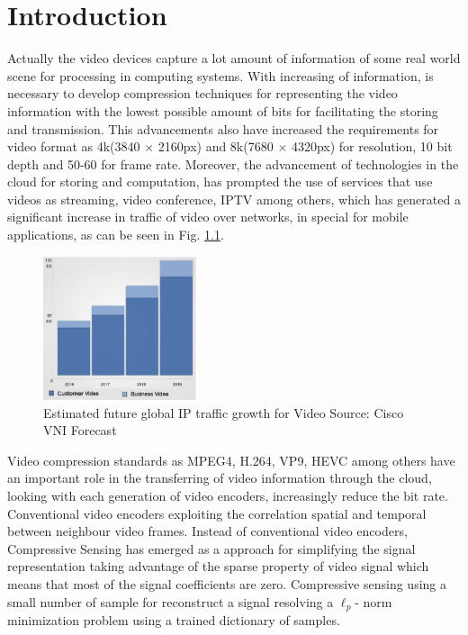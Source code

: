 \chapter{Introduction}


Actually the video devices capture a lot amount of information of some real world scene for processing in computing systems. With increasing of information, is necessary  to develop compression techniques for representing the video information with the lowest possible amount of bits for facilitating the storing and transmission. This advancements also have increased the requirements for video format as 4k(3840 $\times$ 2160px) and 8k(7680 $\times$ 4320px) for resolution, 10 bit depth and 50-60 for frame rate. Moreover, the advancement of technologies in the cloud for storing and computation, has prompted the use of services that use videos as streaming, video conference, IPTV among others, which has generated a significant increase in traffic of video over networks, in special for mobile applications, as can be seen in Fig. \ref{fig:vni}.

\begin{figure}[!h]
\centering
\includegraphics[width=0.4\textwidth]{images/vni.eps}
\caption[Estimated future global IP traffic growth for Video]{Estimated future global IP traffic growth for Video \scriptsize{Source: Cisco VNI Forecast}} 
\label{fig:vni}
\end{figure}

Video compression standards as MPEG4, H.264, VP9, HEVC among others have an important role in the transferring of video information through the cloud, looking with each generation of video encoders, increasingly reduce the bit rate. Conventional video encoders exploiting the correlation spatial and temporal between neighbour video frames. Instead of conventional video encoders, Compressive Sensing has emerged as a approach for simplifying the signal representation taking advantage of the sparse property of video signal which means that most of the signal coefficients are zero. Compressive sensing using a small number of sample for reconstruct a signal resolving a $\ell_p$- norm minimization problem using a trained dictionary of samples.\\

